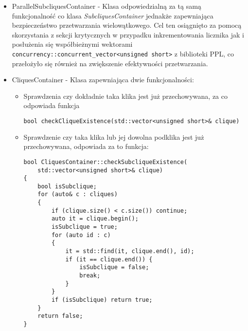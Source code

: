\documentclass[12pt]{article}
\def\inline{\lstinline[basicstyle=\ttfamily,keywordstyle={}]}
\begin{document}
\begin{itemize}
Weryfikację umożliwia algorytm:
\begin{minipage}{\linewidth}
\begin{lstlisting}[caption={Kod metody checkCliqueExistence klasy SubcliquesContainer}]
bool SubcliquesContainer::checkCliqueExistence(
	std::vector<unsigned short>& clique)
{
	assert(clique.size() >= 2);

	std::vector<bool> types(cliquesCounter, false);
	std::vector<bool> typesNew(cliquesCounter, false);

	for (auto type : typesMap[clique[0]])
	{
		types[type] = true;
	}

	for (auto i = 1; i < clique.size(); ++i)
	{
		for (auto id : typesMap[clique[i]])
		{
			if (types[id]) typesNew[id] = true;
		}
		types = typesNew;
		std::fill(typesNew.begin(), typesNew.end(), false);
	}

	if (std::find(types.begin(), types.end(), true) != types.end())
		return true;

	return false;
}
\end{lstlisting}
\end{minipage}
	
\item ParallelSubcliquesContainer - Klasa odpowiedzialną za tą samą funkcjonalność co klasa \textit{SubcliquesContainer} jednakże zapewniająca bezpieczeństwo przetwarzania wielowątkowego. Cel ten osiągnięto za pomocą skorzystania z sekcji krytycznych w przypadku inkrementowania licznika jak i posłużenia się współbieżnymi wektorami \inline{concurrency::concurrent_vector<unsigned short>} z biblioteki PPL, co przełożyło się również na zwiększenie efektywności przetwarzania.

\item CliquesContainer - Klasa zapewniająca dwie funkcjonalności:
\begin{itemize}
\item Sprawdzenia czy dokładnie taka klika jest już przechowywana, za co odpowiada funkcja \raggedright \inline{bool checkCliqueExistence(std::vector<unsigned short>& clique)}
\item Sprawdzenie czy taka klika lub jej dowolna podklika jest już przechowywana, odpowiada za to funkcja:
\begin{minipage}{\linewidth}
\begin{lstlisting}[caption={Kod metody checkSublicqueExistence klasy CliquesContainer }]
bool CliquesContainer::checkSubcliqueExistence(
	std::vector<unsigned short>& clique)
{
	bool isSubclique;
  	for (auto& c : cliques)
  	{
		if (clique.size() < c.size()) continue;
    	auto it = clique.begin();
    	isSubclique = true;
        for (auto id : c)
        {
        	it = std::find(it, clique.end(), id);
        	if (it == clique.end()) {
        		isSubclique = false;
        		break;
        	}
        }
   		if (isSubclique) return true;
  	}
  	return false;
}
\end{lstlisting}
\end{minipage}
\end{itemize}


\end{itemize}
\end{document}
